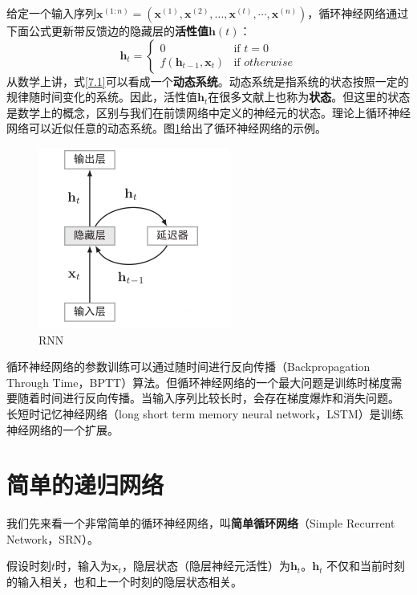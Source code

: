 \documentclass[11pt,fleqn, UTF8]{ctexbook} %
\begin{document}
给定一个输入序列$\boldsymbol{x}^{(1:n)}= (\boldsymbol{x}^{(1)},\boldsymbol{x}^{(2)},...,\boldsymbol{x}^{(t)},\cdots ,\boldsymbol{x}^{(n)})$，循环神经网络通过下面公式更新带反馈边的隐藏层的\textbf{活性值}$\boldsymbol{h}(t)$：
\begin{equation}\label{7.1}
  \boldsymbol{h}_t =
  \begin{cases}
   0 & \text{if } t= 0 \\
   f(\boldsymbol{h}_{t-1},\boldsymbol{x}_t)       & \text{if } otherwise
  \end{cases}
\end{equation}
从数学上讲，式\ref{7.1}可以看成一个\textbf{动态系统}。动态系统是指系统的状态按照一定的规律随时间变化的系统。因此，活性值$\boldsymbol{h}_t$在很多文献上也称为\textbf{状态}。但这里的状态是数学上的概念，区别与我们在前馈网络中定义的神经元的状态。理论上循环神经网络可以近似任意的动态系统。图\ref{fig:7.1}给出了循环神经网络的示例。
\begin{figure}[t]
 \centering
 \includegraphics{pics/71.png}
 \caption{RNN}
 \label{fig:7.1}
\end{figure}
循环神经网络的参数训练可以通过随时间进行反向传播（Backpropagation Through Time，BPTT）算法\cite{werbos1990backpropagation}。但循环神经网络的一个最大问题是训练时梯度需要随着时间进行反向传播。当输入序列比较长时，会存在梯度爆炸和消失问题\cite{bengio1994learning,hochreiter1997long,hochreiter2001gradient}。 长短时记忆神经网络（long short term memory neural network，LSTM）\cite{hochreiter1997long}是训练神经网络的一个扩展。
\section{简单的递归网络}
我们先来看一个非常简单的循环神经网络，叫\textbf{简单循环网络}（Simple Recurrent Network，SRN）\cite{elman1990finding}。

假设时刻$t$时，输入为$\boldsymbol{x}_t$，隐层状态（隐层神经元活性）为$\boldsymbol{h}_t$。$\boldsymbol{h}_t$ 不仅和当前时刻的输入相关，也和上一个时刻的隐层状态相关。
\end{document}
